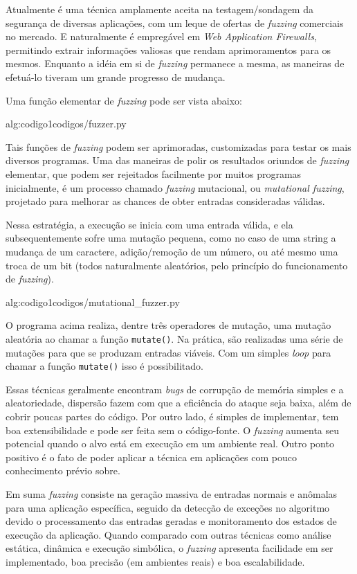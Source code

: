 Atualmente é uma técnica amplamente aceita na testagem/sondagem da segurança de diversas aplicações, com um leque de ofertas de \textit{fuzzing} comerciais no mercado. E naturalmente é empregável em \textit{Web Application Firewalls}, permitindo extrair informações valiosas que rendam aprimoramentos para os mesmos. Enquanto a idéia em si de \textit{fuzzing} permanece a mesma, as maneiras de efetuá-lo tiveram um grande progresso de mudança.


Uma função elementar de \textit{fuzzing} pode ser vista abaixo:

 {alg:codigo1}{codigos/fuzzer.py}

\bigskip
Tais funções de \textit{fuzzing} podem ser aprimoradas, customizadas para testar os mais diversos programas. Uma das maneiras de polir os resultados oriundos de \textit{fuzzing} elementar, que podem ser rejeitados facilmente por muitos programas inicialmente, é um processo chamado \textit{fuzzing} mutacional, ou \textit{mutational fuzzing}, projetado para melhorar as chances de obter entradas consideradas válidas.

Nessa estratégia, a execução se inicia com uma entrada válida, e ela subsequentemente sofre uma mutação pequena, como no caso de uma string a mudança de um caractere, adição/remoção de um número, ou até mesmo uma troca de um bit (todos naturalmente aleatórios, pelo princípio do funcionamento de \textit{fuzzing}).

 {alg:codigo1}{codigos/mutational_fuzzer.py}

\bigskip
O programa acima realiza, dentre três operadores de mutação, uma mutação aleatória ao chamar a função \verb+mutate()+. Na prática, são realizadas uma série de mutações para que se produzam entradas viáveis. Com um simples \textit{loop} para chamar a função \verb+mutate()+ isso é possibilitado.

Essas técnicas geralmente encontram \textit{bugs} de corrupção de memória simples e a aleatoriedade, dispersão fazem com que a eficiência do ataque seja baixa, além de cobrir poucas partes do código. Por outro lado, é simples de implementar, tem boa extensibilidade e pode ser feita sem o código-fonte. O \textit{fuzzing} aumenta seu potencial quando o alvo está em execução em um ambiente real. Outro ponto positivo é o fato de poder aplicar a técnica em aplicações com pouco conhecimento prévio sobre.

Em suma \textit{fuzzing} consiste na geração massiva de entradas normais e anômalas para uma aplicação específica, seguido da detecção de exceções no algoritmo devido o processamento das entradas geradas e monitoramento dos estados de execução da aplicação. Quando comparado com outras técnicas como análise estática, dinâmica e execução simbólica, o \textit{fuzzing} apresenta facilidade em ser implementado, boa precisão (em ambientes reais) e boa escalabilidade.

